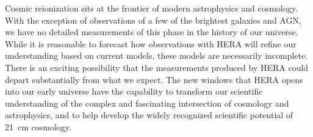 \documentclass[preprint]{aastex}
\begin{document}

Cosmic reionization sits at the frontier of modern astrophysics and cosmology. With the exception of observations of a few
of the brightest galaxies and AGN, we have no detailed measurements of this phase in the history of our universe.  
While it is reasonable to forecast how observations with HERA will refine our understanding based on current
models, these models are necessarily incomplete.  There is an exciting possibility that 
the measurements produced by HERA could depart substantially from what we expect.  The new
windows that HERA opens into our early universe have the capability to transform our scientific
understanding of the complex and fascinating intersection of cosmology and astrophysics, and to
help develop the widely recognized scientific potential of 21~cm cosmology.
\end{document}
